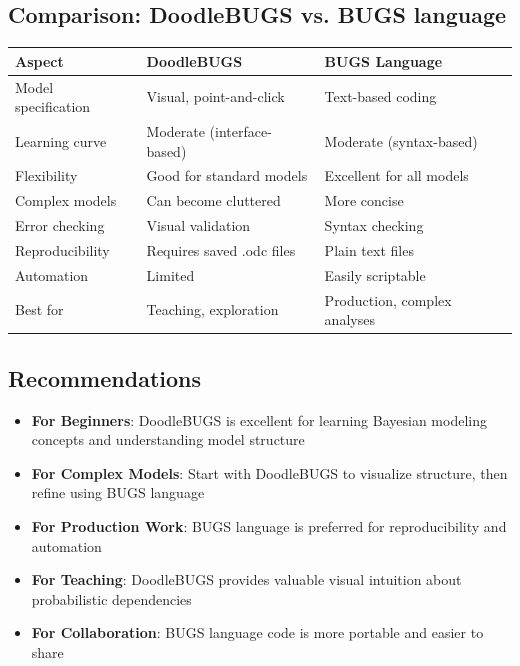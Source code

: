 \subsection{Comparison: DoodleBUGS vs. BUGS language}

\begin{center}
\small
\begin{tabular}{|p{3.5cm}|p{5.5cm}|p{5.5cm}|}
\hline
\textbf{Aspect} & \textbf{DoodleBUGS} & \textbf{BUGS Language} \\
\hline
Model specification & Visual, point-and-click & Text-based coding \\
\hline
Learning curve & Moderate (interface-based) & Moderate (syntax-based) \\
\hline
Flexibility & Good for standard models & Excellent for all models \\
\hline
Complex models & Can become cluttered & More concise \\
\hline
Error checking & Visual validation & Syntax checking \\
\hline
Reproducibility & Requires saved .odc files & Plain text files \\
\hline
Automation & Limited & Easily scriptable \\
\hline
Best for & Teaching, exploration & Production, complex analyses \\
\hline
\end{tabular}
\end{center}

\subsection{Recommendations}

\begin{itemize}
    \item \textbf{For Beginners}: DoodleBUGS is excellent for learning Bayesian modeling concepts and understanding model structure
    \item \textbf{For Complex Models}: Start with DoodleBUGS to visualize structure, then refine using BUGS language
    \item \textbf{For Production Work}: BUGS language is preferred for reproducibility and automation
    \item \textbf{For Teaching}: DoodleBUGS provides valuable visual intuition about probabilistic dependencies
    \item \textbf{For Collaboration}: BUGS language code is more portable and easier to share
\end{itemize}

